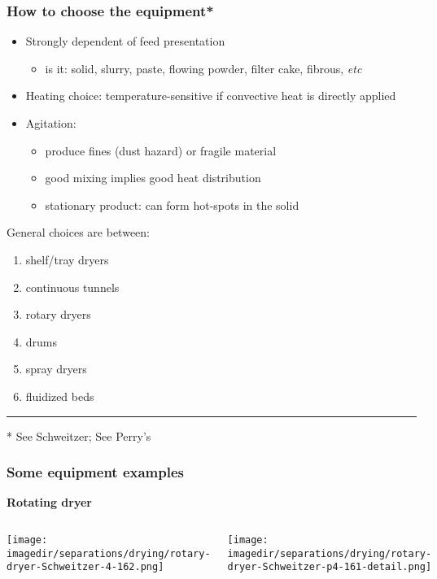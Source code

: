 \begin{frame}\frametitle{How to choose the equipment*}
	\begin{itemize}
		\item	Strongly dependent of feed presentation
		\begin{itemize}
			\item	is it: solid, slurry, paste, flowing powder, filter cake, fibrous, \emph{etc}
		\end{itemize}
		\item	Heating choice: temperature-sensitive if convective heat is directly applied
		\item	Agitation: 
		\begin{itemize}
			\item	produce fines (dust hazard) or fragile material
			\item	good mixing implies good heat distribution
			\item	stationary product: can form hot-spots in the solid
		\end{itemize}
	\end{itemize}
	
	General choices are between:
	\begin{enumerate}
		\item	shelf/tray dryers
		\item	continuous tunnels
		\item	rotary dryers
		\item	drums
		\item	spray dryers
		\item	fluidized beds
	\end{enumerate}
	\vspace{4pt}
	\hrule
	\vspace{4pt}
	* See Schweitzer; See Perry's
\end{frame}

\begin{frame}\frametitle{Some equipment examples}
	\textbf{Rotating dryer}
	\begin{columns}[t]
			\begin{center}
				\texttt{[image: \\imagedir/separations/drying/rotary-dryer-Schweitzer-4-162.png]}
			\end{center}
			\begin{center}
				\texttt{[image: \\imagedir/separations/drying/rotary-dryer-Schweitzer-p4-161-detail.png]}
			\end{center}
	\end{columns}
\end{frame}

